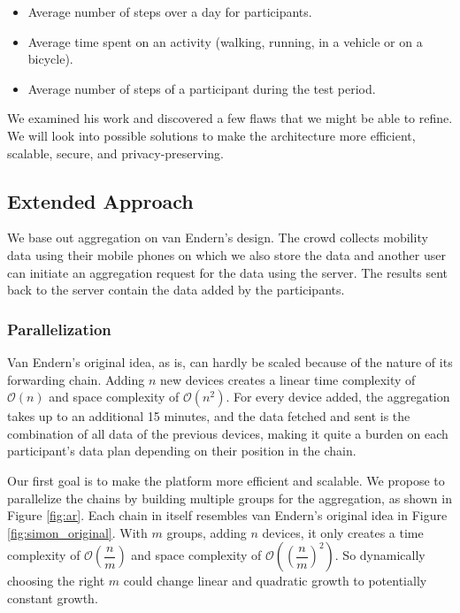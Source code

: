 \begin{itemize}
    \item Average number of steps over a day for participants. 
    \item Average time spent on an activity (walking, running, in a vehicle or on a bicycle).
    \item Average number of steps of a participant during the test period. 
\end{itemize}

We examined his work and discovered a few flaws that we might be able to refine. We will look into possible solutions to make the architecture more efficient, scalable, secure, and privacy-preserving.

\subsection{Extended Approach}
We base out aggregation on van Endern's design. The crowd collects mobility data using their mobile phones on which we also store the data and another user can initiate an aggregation request for the data using the server. The results sent back to the server contain the data added by the participants.

\subsubsection{Parallelization}
Van Endern's original idea, as is, can hardly be scaled because of the nature of its forwarding chain. Adding \(n\) new devices creates a linear time complexity of \(\mathcal{O}(n)\) and space complexity of \(\mathcal{O}(n^2)\). For every device added, the aggregation takes up to an additional 15 minutes, and the data fetched and sent is the combination of all data of the previous devices, making it quite a burden on each participant's data plan depending on their position in the chain.

Our first goal is to make the platform more efficient and scalable. We propose to parallelize the chains by building multiple groups for the aggregation, as shown in Figure \ref{fig:ar}. Each chain in itself resembles van Endern's original idea in Figure \ref{fig:simon_original}. With \(m\) groups, adding \(n\) devices, it only creates a time complexity of \(\mathcal{O}(\dfrac{n}{m})\) and space complexity of \(\mathcal{O}((\dfrac{n}{m})^2)\). So dynamically choosing the right \(m\) could change linear and quadratic growth to potentially constant growth. 

